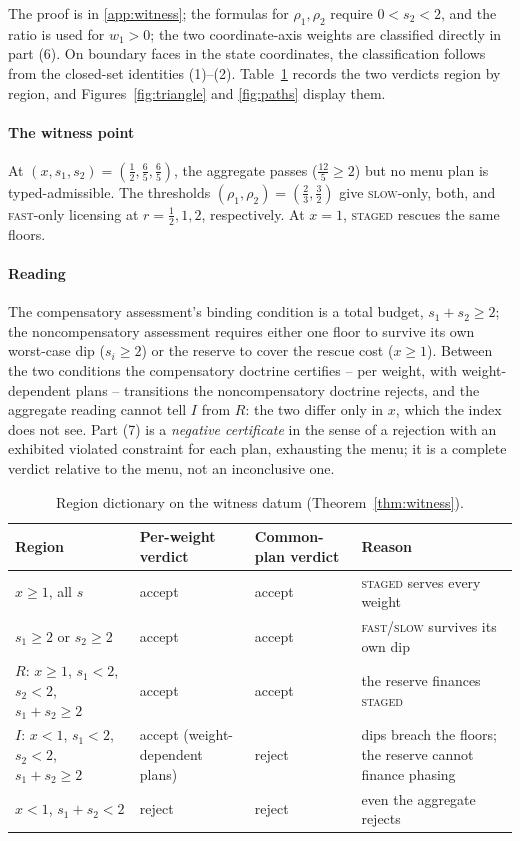 \documentclass[preprint,11pt,authoryear]{elsarticle}
\theoremstyle{definition}
\theoremstyle{remark}
\newcommand{\act}[1]{\textsc{#1}}
\begin{document}
The proof is in \ref{app:witness}; the formulas for $\rho_1,\rho_2$ require $0<s_2<2$, and the ratio is used for $w_1>0$; the two coordinate-axis weights are classified directly in part (6). On boundary faces in the state coordinates, the classification follows from the closed-set identities (1)--(2). Table~\ref{tab:regions} records the two verdicts region by region, and Figures~\ref{fig:triangle} and \ref{fig:paths} display them.

\paragraph{The witness point} At $(x,s_1,s_2)=(\tfrac12,\tfrac65,\tfrac65)$, the aggregate passes ($\tfrac{12}5\ge2$) but no menu plan is typed-admissible. The thresholds $(\rho_1,\rho_2)=(\tfrac23,\tfrac32)$ give \act{slow}-only, both, and \act{fast}-only licensing at $r=\tfrac12,1,2$, respectively. At $x=1$, \act{staged} rescues the same floors.

\paragraph{Reading} The compensatory assessment's binding condition is a total budget, $s_1+s_2\ge2$; the noncompensatory assessment requires either one floor to survive its own worst-case dip ($s_i\ge2$) or the reserve to cover the rescue cost ($x\ge1$). Between the two conditions the compensatory doctrine certifies -- per weight, with weight-dependent plans -- transitions the noncompensatory doctrine rejects, and the aggregate reading cannot tell $I$ from $R$: the two differ only in $x$, which the index does not see. Part (7) is a \emph{negative certificate} in the sense of a rejection with an exhibited violated constraint for each plan, exhausting the menu; it is a complete verdict relative to the menu, not an inconclusive one.

\begin{table}[!htbp]
\centering\small
\caption{Region dictionary on the witness datum (Theorem~\ref{thm:witness}).}
\label{tab:regions}
\begin{tabularx}{\textwidth}{@{}>{\raggedright\arraybackslash}p{}>{\raggedright\arraybackslash}p{}>{\raggedright\arraybackslash}p{}X@{}}
\toprule
Region & Per-weight verdict & Common-plan verdict & Reason \\
\midrule
$x\ge1$, all $s$ & accept & accept & \act{staged} serves every weight \\
$s_1\ge2$ or $s_2\ge2$ & accept & accept & \act{fast}/\act{slow} survives its own dip \\
$R$: $x\ge1$, $s_1<2$, $s_2<2$, $s_1+s_2\ge2$ & accept & accept & the reserve finances \act{staged} \\
$I$: $x<1$, $s_1<2$, $s_2<2$, $s_1+s_2\ge2$ & accept (weight-dependent plans) & reject & dips breach the floors; the reserve cannot finance phasing \\
$x<1$, $s_1+s_2<2$ & reject & reject & even the aggregate rejects \\
\bottomrule
\end{tabularx}
\end{table}
\end{document}
